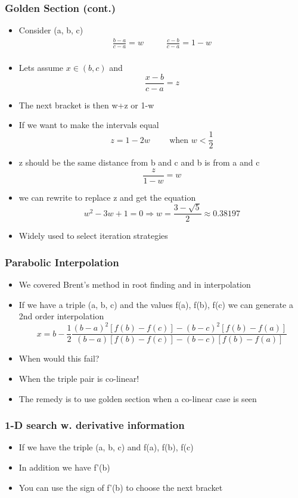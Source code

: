 \documentclass[10pt]{beamer}
\begin{document}
\begin{frame}
  \frametitle{Golden Section (cont.)}
  \begin{itemize}
  \item Consider (a, b, c)
    \[
      \begin{array}{ccc}
        \frac{b-a}{c-a} = w& ~~~~~ & \frac{c-b}{c-a} = 1-w\\
      \end{array}
    \]    
  \item Lets assume $x \in (b,c)$ and
    \[
      \frac{x-b}{c-a} = z
    \]
  \item The next bracket is then w+z or 1-w
    \pause
  \item If we want to make the intervals equal
    \[ z = 1-2w \mbox{~~~~~~ when } w < \frac{1}{2} \]
  \item z should be the same distance from b and c and b is from a and c
    \[ \frac{z}{1-w} = w \]
  \item we can rewrite to replace z and get the equation
    \[ w^2 - 3w +1 = 0 \Rightarrow w = \frac{3-\sqrt{5}}{2} \approx 0.38197 \]
  \item Widely used to select iteration strategies
  \end{itemize}
\end{frame}


\begin{frame}
  \frametitle{Parabolic Interpolation}
  \begin{itemize}
  \item We covered Brent's method in root finding and in interpolation
  \item If we have a triple (a, b, c) and the values f(a), f(b), f(c) we
    can generate a 2nd order interpolation
    \[
      x = b - \frac{1}{2} \frac{(b-a)^2 [f(b)-f(c)] - (b-c)^2 [f(b)-f(a)]}{(b-a)[f(b)-f(c)] - (b-c)[f(b)-f(a)]}
    \]    
  \item When would this fail?
    \pause    
  \item When the triple pair is co-linear!
  \item The remedy is to use golden section when a co-linear case is seen
  \end{itemize}
\end{frame}

\begin{frame}
  \frametitle{1-D search w. derivative information}
  \begin{itemize}
  \item If we have the triple (a, b, c) and f(a), f(b), f(c) 
  \item In addition we have f'(b)
  \item You can use the sign of f'(b) to choose the next bracket
  \end{itemize}
\end{frame}
\end{document}
